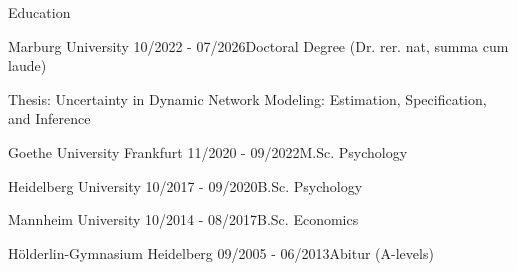 \documentclass{resume} %
\begin{document}
\begin{rSection}{Education}

\begin{rSubsection}{Marburg University} {10/2022 - 07/2026}{Doctoral Degree (Dr. rer. nat, summa cum laude)}\
\item[] Thesis: Uncertainty in Dynamic Network Modeling: Estimation, Specification, and Inference
\end{rSubsection}

\begin{rSubsection}{Goethe University Frankfurt} {11/2020 - 09/2022}{M.Sc. Psychology}\ 
\end{rSubsection}

\begin{rSubsection}{Heidelberg University} {10/2017 - 09/2020}{B.Sc. Psychology}\
\end{rSubsection}

\begin{rSubsection}{Mannheim University} {10/2014 - 08/2017}{B.Sc. Economics}\
\end{rSubsection}

\begin{rSubsection}{Hölderlin-Gymnasium Heidelberg} {09/2005 - 06/2013}{Abitur (A-levels)}\
\end{rSubsection}
\end{rSection}
\end{document}
